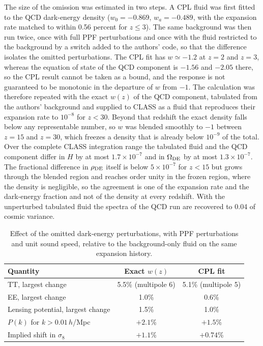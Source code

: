 \documentclass[11pt]{article}
\begin{document}
The size of the omission was estimated in two steps. A CPL fluid was first fitted to the QCD dark-energy density ($w_0=-0.869$, $w_a=-0.489$, with the expansion rate matched to within 0.56 percent for $z\le3$). The same background was then run twice, once with full PPF perturbations \cite{HuSawicki2007,FangHuLewis2008} and once with the fluid restricted to the background by a switch added to the authors' code, so that the difference isolates the omitted perturbations. The CPL fit has $w\simeq-1.2$ at $z=2$ and $z=3$, whereas the equation of state of the QCD component is $-1.56$ and $-2.05$ there, so the CPL result cannot be taken as a bound, and the response is not guaranteed to be monotonic in the departure of $w$ from $-1$. The calculation was therefore repeated with the exact $w(z)$ of the QCD component, tabulated from the authors' background and supplied to CLASS as a fluid that reproduces their expansion rate to $10^{-8}$ for $z<30$. Beyond that redshift the exact density falls below any representable number, so $w$ was blended smoothly to $-1$ between $z=15$ and $z=30$, which freezes a density that is already below $10^{-9}$ of the total. Over the complete CLASS integration range the tabulated fluid and the QCD component differ in $H$ by at most $1.7\times10^{-7}$ and in $\Omega_{\rm DE}$ by at most $1.3\times10^{-7}$. The fractional difference in $\rho_{\rm DE}$ itself is below $5\times10^{-7}$ for $z<15$ but grows through the blended region and reaches order unity in the frozen region, where the density is negligible, so the agreement is one of the expansion rate and the dark-energy fraction and not of the density at every redshift. With the unperturbed tabulated fluid the spectra of the QCD run are recovered to 0.04 of cosmic variance.

\begin{table}[h]
\centering
\begin{tabular}{lcc}
\toprule
Quantity & Exact $w(z)$ & CPL fit\\
\midrule
TT, largest change & 5.5\% (multipole 6) & 5.1\% (multipole 5)\\
EE, largest change & 1.0\% & 0.6\%\\
Lensing potential, largest change & 1.5\% & 1.0\%\\
$P(k)$ for $k>0.01\,h$/Mpc & $+2.1$\% & $+1.5$\%\\
Implied shift in $\sigma_8$ & $+1.1$\% & $+0.74$\%\\
\bottomrule
\end{tabular}
\caption{Effect of the omitted dark-energy perturbations, with PPF perturbations and unit sound speed, relative to the background-only fluid on the same expansion history.}
\end{table}
\end{document}
